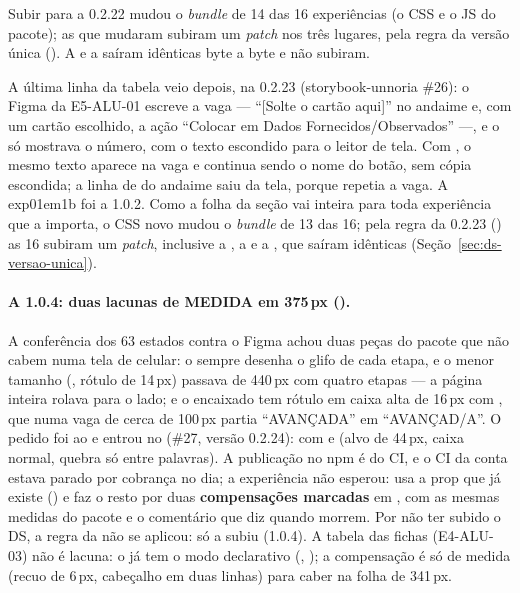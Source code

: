Subir para a 0.2.22 mudou o \emph{bundle} de 14 das 16 experiências (o CSS
e o JS do pacote); as que mudaram subiram um \emph{patch} nos três lugares,
pela regra da versão única (). A  e a
 saíram idênticas byte a byte e não subiram.

A última linha da tabela veio depois, na 0.2.23 (storybook-unnoria \#26): o
Figma da E5-ALU-01 escreve a vaga --- \enquote{[Solte o cartão aqui]} no
andaime e, com um cartão escolhido, a ação \enquote{Colocar em Dados
Fornecidos/Observados} ---, e o  só mostrava o número, com o
texto escondido para o leitor de tela. Com , o mesmo
texto aparece na vaga e continua sendo o nome do botão, sem cópia escondida; a
linha de  do andaime saiu da tela, porque repetia a vaga. A
exp01em1b foi a 1.0.2. Como a folha da seção  vai inteira para
toda experiência que a importa, o CSS novo mudou o \emph{bundle} de 13 das 16;
pela regra da 0.2.23 () as 16 subiram um \emph{patch}, inclusive
a , a  e a , que saíram idênticas
(Seção~\ref{sec:ds-versao-unica}).

\paragraph{A 1.0.4: duas lacunas de MEDIDA em 375\,px ().} A
conferência dos 63 estados contra o Figma achou duas peças do pacote que não
cabem numa tela de celular: o  sempre desenha o glifo de cada
etapa, e o menor tamanho (, rótulo de 14\,px) passava de 440\,px com
quatro etapas --- a página inteira rolava para o lado; e o 
encaixado tem rótulo em caixa alta de 16\,px com , que numa vaga de cerca de 100\,px partia \enquote{AVANÇADA} em
\enquote{AVANÇAD/A}. O pedido foi ao  e entrou no
 (\#27, versão 0.2.24):  com
 e  (alvo de 44\,px, caixa
normal, quebra só entre palavras). A publicação no npm é do CI, e o CI da
conta estava parado por cobrança no dia; a experiência não esperou: usa a
prop que já existe () e faz o resto por duas
\textbf{compensações marcadas} em , com as mesmas
medidas do pacote e o comentário que diz quando morrem. Por não ter subido o
DS, a regra da  não se aplicou: só a  subiu
(1.0.4). A tabela das fichas (E4-ALU-03) não é lacuna: o  já tem
o modo declarativo (, ); a compensação é só de
medida (recuo de 6\,px, cabeçalho em duas linhas) para caber na folha de
341\,px.

